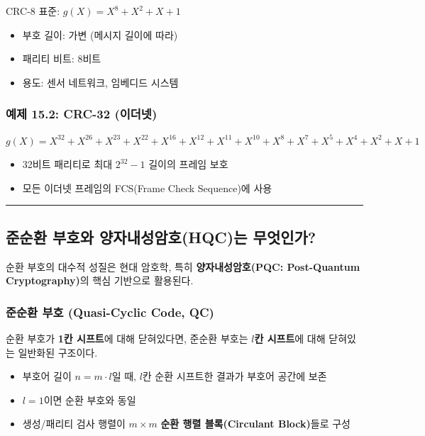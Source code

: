 \documentclass[
  oneside]{article}
\providecommand{\tightlist}{%
  \setlength{\itemsep}{0pt}\setlength{\parskip}{0pt}}
\begin{document}
CRC-8 표준: \(g(X) = X^8 + X^2 + X + 1\)

\begin{itemize}
\tightlist
\item
  부호 길이: 가변 (메시지 길이에 따라)
\item
  패리티 비트: 8비트
\item
  용도: 센서 네트워크, 임베디드 시스템
\end{itemize}

\subsubsection{예제 15.2: CRC-32
(이더넷)}\label{uxc608uxc81c-15.2-crc-32-uxc774uxb354uxb137}

\(g(X) = X^{32} + X^{26} + X^{23} + X^{22} + X^{16} + X^{12} + X^{11} + X^{10} + X^8 + X^7 + X^5 + X^4 + X^2 + X + 1\)

\begin{itemize}
\tightlist
\item
  32비트 패리티로 최대 \(2^{32} - 1\) 길이의 프레임 보호
\item
  모든 이더넷 프레임의 FCS(Frame Check Sequence)에 사용
\end{itemize}

\begin{center}\rule{0.5\linewidth}{0.5pt}\end{center}

\subsection{준순환 부호와 양자내성암호(HQC)는
무엇인가?}\label{uxc900uxc21cuxd658-uxbd80uxd638uxc640-uxc591uxc790uxb0b4uxc131uxc554uxd638hqcuxb294-uxbb34uxc5c7uxc778uxac00}

순환 부호의 대수적 성질은 현대 암호학, 특히 \textbf{양자내성암호(PQC:
Post-Quantum Cryptography)}의 핵심 기반으로 활용된다.

\subsubsection{준순환 부호 (Quasi-Cyclic Code,
QC)}\label{uxc900uxc21cuxd658-uxbd80uxd638-quasi-cyclic-code-qc}

순환 부호가 \textbf{1칸 시프트}에 대해 닫혀있다면, 준순환 부호는
\textbf{\(l\)칸 시프트}에 대해 닫혀있는 일반화된 구조이다.

\begin{itemize}
\tightlist
\item
  부호어 길이 \(n = m \cdot l\)일 때, \(l\)칸 순환 시프트한 결과가
  부호어 공간에 보존
\item
  \(l = 1\)이면 순환 부호와 동일
\item
  생성/패리티 검사 행렬이 \(m \times m\) \textbf{순환 행렬
  블록(Circulant Block)}들로 구성
\end{itemize}
\end{document}
